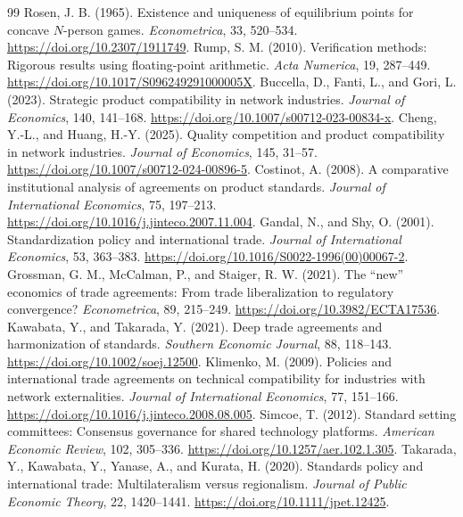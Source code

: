 \documentclass[11pt,a4paper]{article}
\theoremstyle{remark}\newtheorem{remark}[theorem]{Remark}
\begin{document}
\begin{thebibliography}{99}\footnotesize\setlength{\itemsep}{1pt}
 Rosen, J. B. (1965). Existence and uniqueness of equilibrium points for concave $N$-person games. \emph{Econometrica}, 33, 520--534. \url{https://doi.org/10.2307/1911749}.
 Rump, S. M. (2010). Verification methods: Rigorous results using floating-point arithmetic. \emph{Acta Numerica}, 19, 287--449. \url{https://doi.org/10.1017/S096249291000005X}.
 Buccella, D., Fanti, L., and Gori, L. (2023). Strategic product compatibility in network industries. \emph{Journal of Economics}, 140, 141--168. \url{https://doi.org/10.1007/s00712-023-00834-x}.
 Cheng, Y.-L., and Huang, H.-Y. (2025). Quality competition and product compatibility in network industries. \emph{Journal of Economics}, 145, 31--57. \url{https://doi.org/10.1007/s00712-024-00896-5}.
 Costinot, A. (2008). A comparative institutional analysis of agreements on product standards. \emph{Journal of International Economics}, 75, 197--213. \url{https://doi.org/10.1016/j.jinteco.2007.11.004}.
 Gandal, N., and Shy, O. (2001). Standardization policy and international trade. \emph{Journal of International Economics}, 53, 363--383. \url{https://doi.org/10.1016/S0022-1996(00)00067-2}.
 Grossman, G. M., McCalman, P., and Staiger, R. W. (2021). The ``new'' economics of trade agreements: From trade liberalization to regulatory convergence? \emph{Econometrica}, 89, 215--249. \url{https://doi.org/10.3982/ECTA17536}.
 Kawabata, Y., and Takarada, Y. (2021). Deep trade agreements and harmonization of standards. \emph{Southern Economic Journal}, 88, 118--143. \url{https://doi.org/10.1002/soej.12500}.
 Klimenko, M. (2009). Policies and international trade agreements on technical compatibility for industries with network externalities. \emph{Journal of International Economics}, 77, 151--166. \url{https://doi.org/10.1016/j.jinteco.2008.08.005}.
 Simcoe, T. (2012). Standard setting committees: Consensus governance for shared technology platforms. \emph{American Economic Review}, 102, 305--336. \url{https://doi.org/10.1257/aer.102.1.305}.
 Takarada, Y., Kawabata, Y., Yanase, A., and Kurata, H. (2020). Standards policy and international trade: Multilateralism versus regionalism. \emph{Journal of Public Economic Theory}, 22, 1420--1441. \url{https://doi.org/10.1111/jpet.12425}.
\end{thebibliography}
\end{document}
